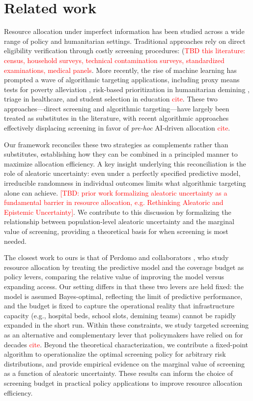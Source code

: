 \section{Related work}

Resource allocation under imperfect information has been studied across a wide range of policy and humanitarian settings. Traditional approaches rely on direct eligibility verification through costly screening procedures: (\textcolor{red}{TBD this literature: census, household surveys, technical contamination surveys, standardized examinations, medical panels}. More recently, the rise of machine learning has prompted a wave of algorithmic targeting applications, including proxy means tests for poverty alleviation \cite{grosh1995proxy, aiken2022machine}, risk-based prioritization in humanitarian demining \cite{dulce2024reland}, triage in healthcare, and student selection in education \textcolor{red}{cite}. These two approaches—direct screening and algorithmic targeting—have largely been treated as substitutes in the literature, with recent algorithmic approaches effectively displacing screening in favor of \textit{pre-hoc} AI-driven allocation \textcolor{red}{cite}.

Our framework reconciles these two strategies as complements rather than substitutes, establishing how they can be combined in a principled manner to maximize allocation efficiency. A key insight underlying this reconciliation is the role of aleatoric uncertainty: even under a perfectly specified predictive model, irreducible randomness in individual outcomes limits what algorithmic targeting alone can achieve. \textcolor{red}{[TBD: prior work formalizing aleatoric uncertainty as a fundamental barrier in resource allocation, e.g. Rethinking Aleatoric and Epistemic Uncertainty]}. We contribute to this discussion by formalizing the relationship between population-level aleatoric uncertainty and the marginal value of screening, providing a theoretical basis for when screening is most needed.

The closest work to ours is that of Perdomo and collaborators \cite{fischer2025value,perdomo2023relative}, who study resource allocation by treating the predictive model and the coverage budget as policy levers, comparing the relative value of improving the model versus expanding access. Our setting differs in that these two levers are held fixed: the model is assumed Bayes-optimal, reflecting the limit of predictive performance, and the budget is fixed to capture the operational reality that infrastructure capacity (e.g., hospital beds, school slots, demining teams) cannot be rapidly expanded in the short run. Within these constraints, we study targeted screening as an alternative and complementary lever that policymakers have relied on for decades \textcolor{red}{cite}. Beyond the theoretical characterization, we contribute a fixed-point algorithm to operationalize the optimal screening policy for arbitrary risk distributions, and provide empirical evidence on the marginal value of screening as a function of aleatoric uncertainty. These results can inform the choice of screening budget in practical policy applications to improve resource allocation efficiency.


